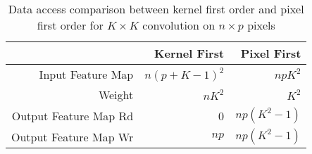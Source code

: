 \begin{table}[htbp]
    \centering
    \caption{Data access comparison between kernel first order and pixel first order for $K\times K$ convolution on $n\times p$ pixels}
    \vspace{-5pt}
      \begin{tabular}{|r|r|r|}
      \hline
            & Kernel First & Pixel First \\
      \hline
      Input Feature Map & $n(p+K-1)^2$ & $npK^2$ \\
      \hline
      Weight & $nK^2$ & $K^2$ \bigstrut\\
      \hline
      Output Feature Map Rd & 0 & $np(K^2-1)$ \\
      \hline
      Output Feature Map Wr & $np$ & $np(K^2-1)$ \\
      \hline
      \end{tabular}
    \label{tab:ram_acc}
  \end{table}